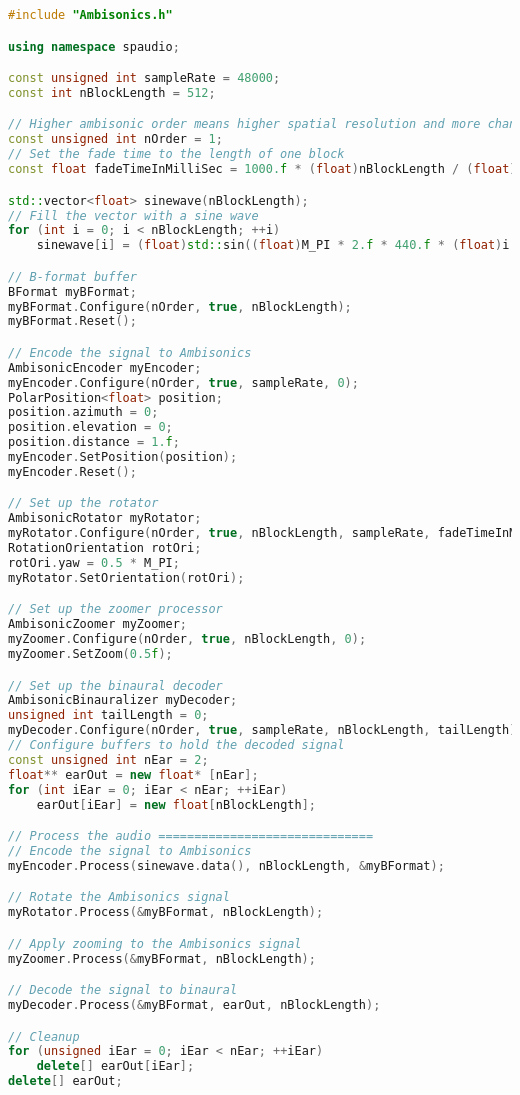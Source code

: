 \documentclass[12pt]{report}
\begin{document}
\begin{lstlisting}[language=C++]
#include "Ambisonics.h"

using namespace spaudio;

const unsigned int sampleRate = 48000;
const int nBlockLength = 512;

// Higher ambisonic order means higher spatial resolution and more channels required
const unsigned int nOrder = 1;
// Set the fade time to the length of one block
const float fadeTimeInMilliSec = 1000.f * (float)nBlockLength / (float)sampleRate;

std::vector<float> sinewave(nBlockLength);
// Fill the vector with a sine wave
for (int i = 0; i < nBlockLength; ++i)
    sinewave[i] = (float)std::sin((float)M_PI * 2.f * 440.f * (float)i / (float)sampleRate);

// B-format buffer
BFormat myBFormat;
myBFormat.Configure(nOrder, true, nBlockLength);
myBFormat.Reset();

// Encode the signal to Ambisonics
AmbisonicEncoder myEncoder;
myEncoder.Configure(nOrder, true, sampleRate, 0);
PolarPosition<float> position;
position.azimuth = 0;
position.elevation = 0;
position.distance = 1.f;
myEncoder.SetPosition(position);
myEncoder.Reset();

// Set up the rotator
AmbisonicRotator myRotator;
myRotator.Configure(nOrder, true, nBlockLength, sampleRate, fadeTimeInMilliSec);
RotationOrientation rotOri;
rotOri.yaw = 0.5 * M_PI;
myRotator.SetOrientation(rotOri);

// Set up the zoomer processor
AmbisonicZoomer myZoomer;
myZoomer.Configure(nOrder, true, nBlockLength, 0);
myZoomer.SetZoom(0.5f);

// Set up the binaural decoder
AmbisonicBinauralizer myDecoder;
unsigned int tailLength = 0;
myDecoder.Configure(nOrder, true, sampleRate, nBlockLength, tailLength);
// Configure buffers to hold the decoded signal
const unsigned int nEar = 2;
float** earOut = new float* [nEar];
for (int iEar = 0; iEar < nEar; ++iEar)
    earOut[iEar] = new float[nBlockLength];

// Process the audio ==============================
// Encode the signal to Ambisonics
myEncoder.Process(sinewave.data(), nBlockLength, &myBFormat);

// Rotate the Ambisonics signal
myRotator.Process(&myBFormat, nBlockLength);

// Apply zooming to the Ambisonics signal
myZoomer.Process(&myBFormat, nBlockLength);

// Decode the signal to binaural
myDecoder.Process(&myBFormat, earOut, nBlockLength);

// Cleanup
for (unsigned iEar = 0; iEar < nEar; ++iEar)
    delete[] earOut[iEar];
delete[] earOut;
\end{lstlisting}
\end{document}
